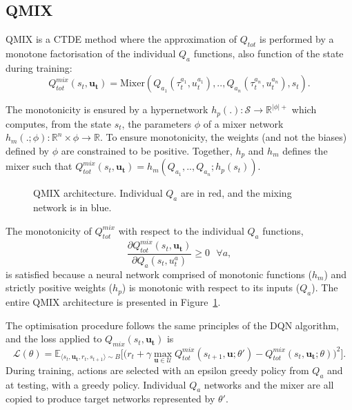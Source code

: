 \subsection{QMIX}
QMIX \citep{Rashid2018} is a CTDE method where the approximation of $Q_{tot}$ is performed by a monotone factorisation of the individual $Q_a$ functions, also function of the state during training:
\begin{equation}
     Q_{tot}^{mix}(s_t, \mathbf{u_t})=\text{Mixer} \left(Q_{a_1}(\tau^{a_1}_t, u_t^{a_1}) ,..,Q_{a_n}(\tau^{a_n}_t, u_t^{a_n}), s_t\right).
     \label{eq:qmixappendix}
\end{equation}

The monotonicity is ensured by a hypernetwork \citep{Ha2016HyperNetworks} $h_p(.): \mathcal{S} \rightarrow \mathbb{R}^{|\phi|+}$ which computes, from the state $s_t$, the parameters $\phi$ of a mixer network $h_m(.;\phi):\mathbb{R}^n \times \phi \rightarrow \mathbb{R}$.
To ensure monotonicity, the weights (and not the biases) defined by $\phi$ are constrained to be positive.
Together, $h_p$ and $h_m$ defines the mixer such that $ Q_{tot}^{mix}(s_t, \mathbf{u_t}) = h_m\left(Q_{a_1},..,Q_{a_n}; h_p(s_t)\right)$.

\begin{figure}
\centering

\caption{QMIX architecture. Individual $Q_a$ are in red, and the mixing network is in blue.}
\label{fig:qmix}
\end{figure}

The monotonicity of $Q_{tot}^{mix}$ with respect to the individual $Q_a$ functions, 
\begin{equation}
    \frac{\partial Q_{tot}^{mix}(s_t, \mathbf{u_t})}{\partial Q_{a}(s_t, u_t^{a})} \geq 0 \text{ } \forall a
    \label{eq:ch3_monotonicity},
\end{equation}
is satisfied because a neural network comprised of monotonic functions ($h_m$) and strictly positive weights ($h_p$) is monotonic with respect to its inputs ($Q_a$). 
The entire QMIX architecture is presented in Figure~\ref{fig:qmix}.

The optimisation procedure follows the same principles of the DQN algorithm, and the loss applied to $Q_{mix}(s_t, \mathbf{u_t})$ is 
\begin{equation}
    \mathcal{L}(\theta) = \mathbb{E}_{\langle s_{t},\mathbf{u_{t}},r_{t},s_{t+1} \rangle \sim B}
    \bigg[  
    \big(r_{t} + \gamma \max_{\mathbf{u} \in \mathcal{U}} Q_{tot}^{mix}(s_{t+1}, \mathbf{u}; \theta')
    - Q_{tot}^{mix}(s_{t}, \mathbf{u_{t}}; \theta)\big)^{2}
    \bigg].
    \label{eq:QMIX_loss}
\end{equation}
During training, actions are selected with an epsilon greedy policy from $Q_a$ and at testing, with a greedy policy.
Individual $Q_a$ networks and the mixer are all copied to produce target networks represented by $\theta'$.

